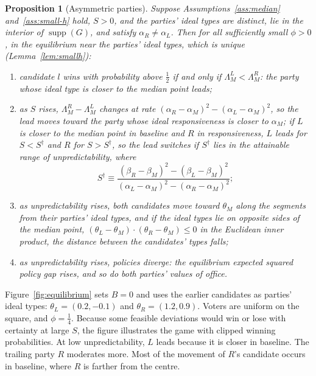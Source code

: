 \documentclass[12pt,letterpaper]{article}
\newtheorem{proposition}{Proposition}
\begin{document}
\begin{proposition}[Asymmetric parties]\label{prop:asymmetric}
Suppose Assumptions~\ref{ass:median} and~\ref{ass:small-h} hold, $S>0$, and the parties' ideal types are distinct, lie in the interior of $\operatorname{supp}(G)$, and satisfy $\alpha_R\ne\alpha_L$. Then for all sufficiently small $\phi>0$, in the equilibrium near the parties' ideal types, which is unique (Lemma~\ref{lem:smallh}):
\begin{enumerate}
  \item[(a)] candidate $l$ wins with probability above $\tfrac12$ if and only if $\Lambda_M^L<\Lambda_M^R$: the party whose ideal type is closer to the median point leads;
  \item[(b)] as $S$ rises, $\Lambda_M^R-\Lambda_M^L$ changes at rate $(\alpha_R-\alpha_M)^2-(\alpha_L-\alpha_M)^2$, so the lead moves toward the party whose ideal responsiveness is closer to $\alpha_M$; if $L$ is closer to the median point in baseline and $R$ in responsiveness, $L$ leads for $S<S^\dagger$ and $R$ for $S>S^\dagger$, so the lead switches if $S^\dagger$ lies in the attainable range of unpredictability, where
  \[
  S^\dagger\equiv\frac{(\beta_R-\beta_M)^2-(\beta_L-\beta_M)^2}{(\alpha_L-\alpha_M)^2-(\alpha_R-\alpha_M)^2};
  \]
  \item[(c)] as unpredictability rises, both candidates move toward $\theta_M$ along the segments from their parties' ideal types, and if the ideal types lie on opposite sides of the median point, $(\theta_L-\theta_M)\cdot(\theta_R-\theta_M)\le0$ in the Euclidean inner product, the distance between the candidates' types falls;
  \item[(d)] as unpredictability rises, policies diverge: the equilibrium expected squared policy gap rises, and so do both parties' values of office.
\end{enumerate}
\end{proposition}

Figure~\ref{fig:equilibrium} sets $B=0$ and uses the earlier candidates as parties' ideal types: $\theta_L=(0.2,-0.1)$ and $\theta_R=(1.2,0.9)$. Voters are uniform on the square, and $\phi=\tfrac14$. Because some feasible deviations would win or lose with certainty at large $S$, the figure illustrates the game with clipped winning probabilities. At low unpredictability, $L$ leads because it is closer in baseline. The trailing party $R$ moderates more. Most of the movement of $R$'s candidate occurs in baseline, where $R$ is farther from the centre.
\end{document}
